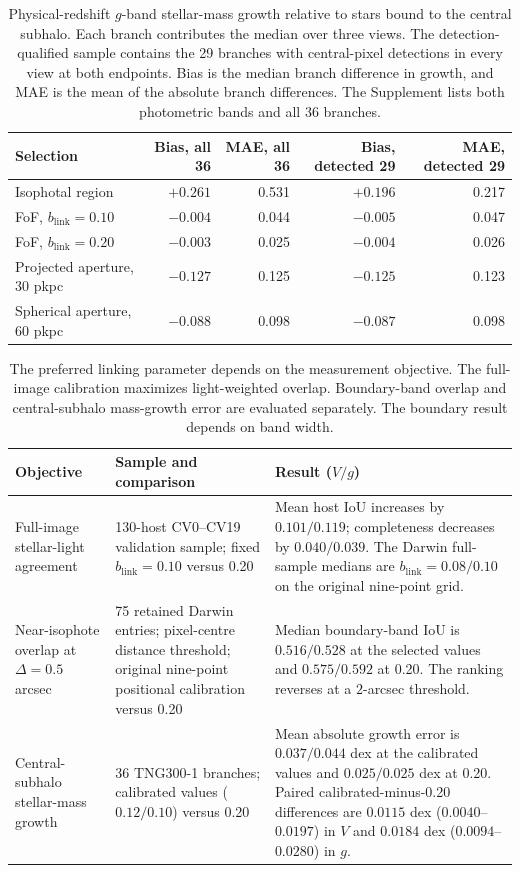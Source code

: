 \documentclass[usenatbib]{mnras}
\begin{document}
\begin{table}
\centering
\caption{Physical-redshift $g$-band stellar-mass growth relative to
stars bound to the central subhalo. Each branch contributes the median
over three views. The detection-qualified sample contains the 29 branches
with central-pixel detections in every view at both endpoints. Bias is
the median branch difference in growth, and MAE is the mean of the
absolute branch differences. The Supplement lists both photometric bands
and all 36 branches.}
\label{tab:growth-cohort}
\small
\begin{tabular}{lrrrr}
\toprule
Selection & Bias, all 36 & MAE, all 36 & Bias, detected 29 & MAE, detected 29 \\
\midrule
Isophotal region & $+0.261$ & 0.531 & $+0.196$ & 0.217 \\
FoF, $b_{\mathrm{link}}=0.10$ & $-0.004$ & 0.044 & $-0.005$ & 0.047 \\
FoF, $b_{\mathrm{link}}=0.20$ & $-0.003$ & 0.025 & $-0.004$ & 0.026 \\
Projected aperture, 30 pkpc & $-0.127$ & 0.125 & $-0.125$ & 0.123 \\
Spherical aperture, 60 pkpc & $-0.088$ & 0.098 & $-0.087$ & 0.098 \\
\bottomrule
\end{tabular}
\end{table}

\begin{table}
\centering
\caption{The preferred linking parameter depends on the measurement
objective. The full-image calibration maximizes light-weighted overlap.
Boundary-band overlap and central-subhalo mass-growth error are evaluated
separately. The boundary result depends on band width.}
\label{tab:objectives}
\small
\begin{tabular}{p{3.1cm}p{4.0cm}p{7.0cm}}
\toprule
Objective & Sample and comparison & Result ($V/g$) \\
\midrule
Full-image stellar-light agreement &
130-host CV0--CV19 validation sample; fixed $b_{\mathrm{link}}=0.10$ versus 0.20 &
Mean host IoU increases by $0.101/0.119$; completeness decreases by
$0.040/0.039$. The Darwin full-sample medians are
$b_{\mathrm{link}}=0.08/0.10$ on the original nine-point grid. \\
Near-isophote overlap at $\Delta=0.5$ arcsec &
75 retained Darwin entries; pixel-centre distance threshold; original nine-point positional calibration versus 0.20 &
Median boundary-band IoU is $0.516/0.528$ at the selected values and
$0.575/0.592$ at 0.20. The ranking reverses at a $2$-arcsec threshold. \\
Central-subhalo stellar-mass growth &
36 TNG300-1 branches; calibrated values ($0.12/0.10$) versus 0.20 &
Mean absolute growth error is $0.037/0.044$ dex at the calibrated values
and $0.025/0.025$ dex at 0.20. Paired calibrated-minus-0.20 differences
are $0.0115$ dex ($0.0040$--$0.0197$) in $V$ and $0.0184$ dex
($0.0094$--$0.0280$) in $g$. \\
\bottomrule
\end{tabular}
\end{table}
\end{document}

